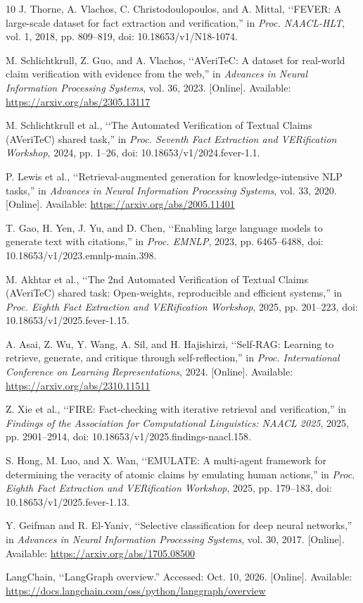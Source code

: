 \documentclass[conference]{IEEEtran}
\begin{document}
\newpage
\begin{thebibliography}{10}
J. Thorne, A. Vlachos, C. Christodoulopoulos, and A. Mittal, \lq\lq FEVER: A large-scale dataset for fact extraction and verification,'' in \emph{Proc. NAACL-HLT}, vol. 1, 2018, pp. 809--819, doi: 10.18653/v1/N18-1074.

M. Schlichtkrull, Z. Guo, and A. Vlachos, \lq\lq AVeriTeC: A dataset for real-world claim verification with evidence from the web,'' in \emph{Advances in Neural Information Processing Systems}, vol. 36, 2023. [Online]. Available: \url{https://arxiv.org/abs/2305.13117}

M. Schlichtkrull et al., \lq\lq The Automated Verification of Textual Claims (AVeriTeC) shared task,'' in \emph{Proc. Seventh Fact Extraction and VERification Workshop}, 2024, pp. 1--26, doi: 10.18653/v1/2024.fever-1.1.

P. Lewis et al., \lq\lq Retrieval-augmented generation for knowledge-intensive NLP tasks,'' in \emph{Advances in Neural Information Processing Systems}, vol. 33, 2020. [Online]. Available: \url{https://arxiv.org/abs/2005.11401}

T. Gao, H. Yen, J. Yu, and D. Chen, \lq\lq Enabling large language models to generate text with citations,'' in \emph{Proc. EMNLP}, 2023, pp. 6465--6488, doi: 10.18653/v1/2023.emnlp-main.398.

M. Akhtar et al., \lq\lq The 2nd Automated Verification of Textual Claims (AVeriTeC) shared task: Open-weights, reproducible and efficient systems,'' in \emph{Proc. Eighth Fact Extraction and VERification Workshop}, 2025, pp. 201--223, doi: 10.18653/v1/2025.fever-1.15.

A. Asai, Z. Wu, Y. Wang, A. Sil, and H. Hajishirzi, \lq\lq Self-RAG: Learning to retrieve, generate, and critique through self-reflection,'' in \emph{Proc. International Conference on Learning Representations}, 2024. [Online]. Available: \url{https://arxiv.org/abs/2310.11511}

Z. Xie et al., \lq\lq FIRE: Fact-checking with iterative retrieval and verification,'' in \emph{Findings of the Association for Computational Linguistics: NAACL 2025}, 2025, pp. 2901--2914, doi: 10.18653/v1/2025.findings-naacl.158.

S. Hong, M. Luo, and X. Wan, \lq\lq EMULATE: A multi-agent framework for determining the veracity of atomic claims by emulating human actions,'' in \emph{Proc. Eighth Fact Extraction and VERification Workshop}, 2025, pp. 179--183, doi: 10.18653/v1/2025.fever-1.13.

Y. Geifman and R. El-Yaniv, \lq\lq Selective classification for deep neural networks,'' in \emph{Advances in Neural Information Processing Systems}, vol. 30, 2017. [Online]. Available: \url{https://arxiv.org/abs/1705.08500}

LangChain, \lq\lq LangGraph overview.'' Accessed: Oct. 10, 2026. [Online]. Available: \url{https://docs.langchain.com/oss/python/langgraph/overview}
\end{thebibliography}
\end{document}

